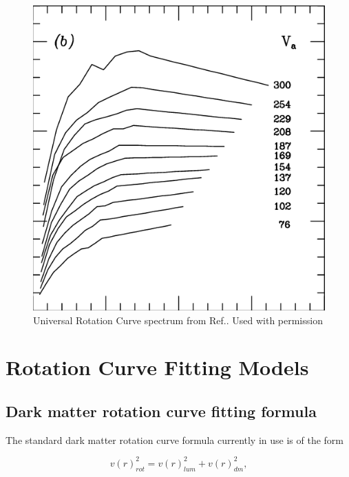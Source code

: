 \documentclass[reprint,%
 amsmath,amssymb,
 aps,
]{revtex4-1}
\begin{document}
   
 \begin{figure}[h!]
     \centering
     \includegraphics[width=\linewidth]{The-universal-rotation-curve-of-spiral-galaxies-at-different-luminosities-and-velocities}
     \caption{Universal Rotation Curve spectrum from Ref.\citep{salucci}. Used with permission}
     \label{fig:URC}
\end{figure}
 
\section{ Rotation Curve Fitting Models  \label{sec:dos}}
 
 
 \subsection{Dark matter rotation curve fitting formula}
 
  

 The  standard dark matter rotation curve formula currently in use  is of the form

 \begin{equation}
v(r)^2_{rot}  =  v(r)^2_{lum}  +  v(r)^2_{dm},   
\label{eq:zonte1}
\end{equation} 
\end{document}
